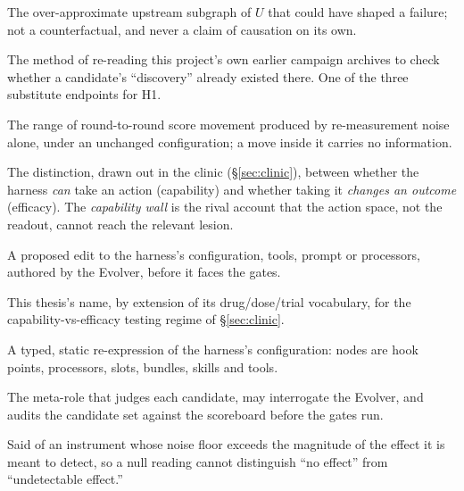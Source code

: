 \begin{description}[leftmargin=1.8em,labelsep=0.4em,itemsep=0.5pt,parsep=0pt,topsep=2pt]

\item[ancestor cone (cone)] The over-approximate upstream subgraph of $U$
that could have shaped a failure; not a counterfactual, and never a claim
of causation on its own.

\item[archaeology] The method of re-reading this project's own earlier
campaign archives to check whether a candidate's ``discovery'' already
existed there. One of the three substitute endpoints for H1.

\item[band (same-config band)] The range of round-to-round score movement
produced by re-measurement noise alone, under an unchanged configuration; a
move inside it carries no information.

\item[capability vs efficacy] The distinction, drawn out in the clinic
(\S\ref{sec:clinic}), between whether the harness \emph{can} take an
action (capability) and whether taking it \emph{changes an outcome}
(efficacy). The \emph{capability wall} is the rival account that the
action space, not the readout, cannot reach the relevant lesion.

\item[candidate] A proposed edit to the harness's configuration, tools,
prompt or processors, authored by the Evolver, before it faces the gates.

\item[the clinic] This thesis's name, by extension of its drug/dose/trial
vocabulary, for the capability-vs-efficacy testing regime of
\S\ref{sec:clinic}.

\item[composition graph ($G$)] A typed, static re-expression of the
harness's configuration: nodes are hook points, processors, slots,
bundles, skills and tools.

\item[Critic] The meta-role that judges each candidate, may interrogate
the Evolver, and audits the candidate set against the scoreboard before
the gates run.

\item[deaf (selection is deaf)] Said of an instrument whose noise floor
exceeds the magnitude of the effect it is meant to detect, so a null
reading cannot distinguish ``no effect'' from ``undetectable effect.''


\end{description}
